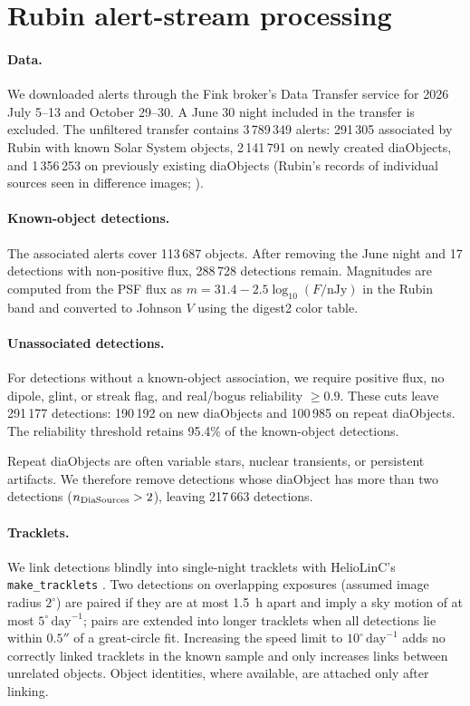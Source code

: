 \documentclass[linenumbers,twocolumn]{aastex701}
\begin{document}
\section{Rubin alert-stream processing}
\label{app:rubindata}

\paragraph{Data.}
We downloaded alerts through the Fink broker's Data Transfer service
\citep{moller2021} for 2026 July 5--13 and October 29--30. A June 30 night
included in the transfer is excluded. The unfiltered transfer contains
3\,789\,349 alerts: 291\,305 associated by Rubin with known Solar System
objects, 2\,141\,791 on newly created diaObjects, and 1\,356\,253 on
previously existing diaObjects (Rubin's records of individual sources seen
in difference images; \citealt{LSE-163}).

\paragraph{Known-object detections.}
The associated alerts cover 113\,687 objects. After removing the June night
and 17 detections with non-positive flux, 288\,728 detections remain.
Magnitudes are computed from the PSF flux as
$m=31.4-2.5\log_{10}(F/\mathrm{nJy})$ in the Rubin band and converted to
Johnson $V$ using the digest2 color table.

\paragraph{Unassociated detections.}
For detections without a known-object association, we require positive flux,
no dipole, glint, or streak flag, and real/bogus reliability $\geq0.9$.
These cuts leave 291\,177 detections: 190\,192 on new diaObjects and
100\,985 on repeat diaObjects. The reliability threshold retains 95.4\% of
the known-object detections.

Repeat diaObjects are often variable stars, nuclear transients, or persistent
artifacts. We therefore remove detections whose diaObject has more than two
detections ($n_{\rm DiaSources}>2$), leaving 217\,663 detections.

\paragraph{Tracklets.}
We link detections blindly into single-night tracklets with HelioLinC's
\texttt{make\_tracklets} \citep{heinze2022AAS}. Two detections on
overlapping exposures (assumed image radius $2^\circ$) are paired if they
are at most 1.5~h apart and imply a sky motion of at most
$5^\circ\,\mathrm{day}^{-1}$; pairs are extended into longer tracklets when
all detections lie within $0.5''$ of a great-circle fit. Increasing the speed limit to
$10^\circ\,\mathrm{day}^{-1}$ adds no correctly linked tracklets in the known
sample and only increases links between unrelated objects. Object identities,
where available, are attached only after linking.
\end{document}
